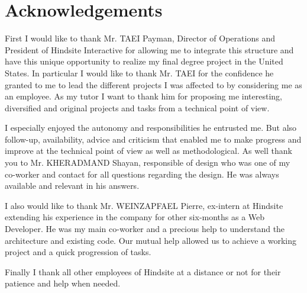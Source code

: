 \chapter*{Acknowledgements}

First I would like to thank Mr. TAEI Payman, Director of Operations and President of
Hindsite Interactive for allowing me to integrate this structure and have this unique
opportunity to realize my final degree project in the United States.
In particular I would like to thank Mr. TAEI for the confidence he granted to me to
lead the different projects I was affected to by considering me as an employee.
As my tutor I want to thank him for proposing me interesting, diversified and original
projects and tasks from a technical point of view. 

I especially enjoyed the autonomy
and responsibilities he entrusted me. But also follow-up, availability, advice and
criticism that enabled me to make progress and improve at the technical point of
view as well as methodological.
As well thank you to Mr. KHERADMAND Shayan, responsible of design who was
one of my co-worker and contact for all questions regarding the design. He was
always available and relevant in his answers.

I also would like to thank Mr. WEINZAPFAEL Pierre, ex-intern at Hindsite extending his
experience in the company for other six-months as a Web Developer. He was my
main co-worker and a precious help to understand the architecture and existing
code. Our mutual help allowed us to achieve a working project and a quick
progression of tasks.

Finally I thank all other employees of Hindsite at a distance or not for their patience
and help when needed.
